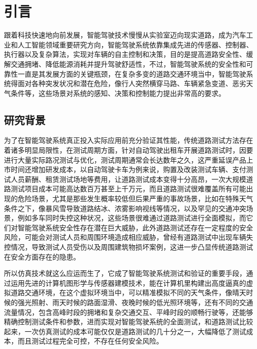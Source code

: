 \chapter{引言}

跟着科技快速地向前发展，智能驾驶技术慢慢从实验室迈向现实道路，成为汽车工业和人工智能领域重要研究方向，智能驾驶系统依靠集成先进的传感器、控制器、执行器以及复杂算法，实现对车辆的自主控制和决策，目的是提高道路安全性、缓解交通拥堵、降低能源消耗并提升驾驶舒适性，不过，智能驾驶系统的安全性和可靠性一直是其发展方面的关键瓶颈，在复杂多变的道路交通环境当中，智能驾驶系统得面对各种突发状况和潜在危险，像行人突然横穿马路、车辆紧急变道、恶劣天气条件等，这些场景对系统的感知、决策和控制能力提出非常高的要求。

\section{研究背景}


为了在智能驾驶系统真正投入实际应用前充分验证其性能，传统道路测试方法存在着诸多明显局限性，在测试周期方面，针对自动驾驶出租车开展道路测试时，因要进行大量实际路况测试与优化，测试周期通常会长达数年之久，这严重延误产品上市时间还增加研发成本，以自动驾驶卡车为例来说，购置及改装测试车辆、支付测试人员薪酬、租赁测试场地等费用，让道路测试成本变得十分高昂，一次大规模道路测试项目成本可能高达数百万甚至上千万元，而且道路测试很难覆盖所有可能出现的危险场景，尤其是那些发生概率较低但后果严重的事故场景，比如在特殊天气条件之下，像暴风雪导致道路结冰、浓雾影响视线等情况，以及罕见的交通冲突场景，例如多车同时失控这种状况，这些场景很难通过道路测试进行全面模拟，而它们对智能驾驶系统安全性存在潜在巨大威胁，此外道路测试还存在一定程度的安全风险，可能会对测试人员和周围环境造成相应威胁，曾经有道路测试中出现车辆失控情况，导致测试人员受伤以及周围建筑物损坏案例，这进一步凸显传统道路测试在安全方面存在的隐患。

所以仿真技术就这么应运而生了，它成了智能驾驶系统测试和验证的重要手段，通过运用先进的计算机图形学与传感器建模技术，能在计算机里构建出高度逼真的虚拟道路交通环境，在这个虚拟环境当中，可以精准模拟不同的天气条件，像晴天时候的强光照射、雨天时候的路面湿滑、夜晚时候的低光照环境等，还有不同的交通流量情况，包含高峰时段的拥堵和复杂交通交互、平峰时段的顺畅行驶等，还能够精确控制测试条件和参数，\cite{cheng2011analysis}进而实现对智能驾驶系统的全面测试，和道路测试比较起来，一次仿真测试的成本可能仅仅是道路测试的几十分之一，大幅降低了测试成本，而且测试过程完全可控，不存在任何安全风险。

